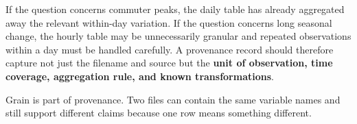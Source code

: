If the question concerns commuter peaks, the daily table has already aggregated away the relevant within-day variation. If the question concerns long seasonal change, the hourly table may be unnecessarily granular and repeated observations within a day must be handled carefully. A provenance record should therefore capture not just the filename and source but the \textbf{unit of observation, time coverage, aggregation rule, and known transformations}.

\begin{keyidea}
Grain is part of provenance. Two files can contain the same variable names and still support different claims because one row means something different.
\end{keyidea}
